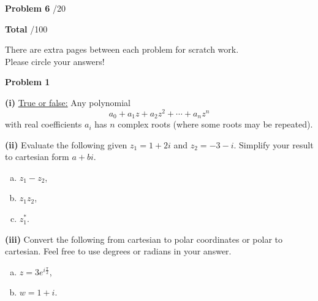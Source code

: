 \documentclass[12pt]{amsbook}
\begin{document}
\textbf{Problem 6} \; \underline{\hspace{1cm}}/20

\vspace{.5cm}

\textbf{Total} \;\hspace{1.1cm} \underline{\hspace{1.25cm}}/100

\vspace*{4cm}


\begin{center}\large{There are extra pages between each problem for scratch work.\\

Please circle your answers!}\end{center}










\newpage

\textbf{Problem 1}

\vspace{.25cm}

\textbf{(i)} \underline{True or false:} Any polynomial
\[
a_0 + a_1z+a_2z^2+\cdots +a_nz^n
\]
with real coefficients $a_i$ has $n$ complex roots (where some roots may be repeated).
\vspace*{1cm}

\textbf{(ii)} Evaluate the following given $z_1=1+2i$ and $z_2= -3-i$. Simplify your result to cartesian form $a+bi$.
\begin{enumerate}[(a)]
    \item $z_1-z_2$,
    \vspace*{2cm}
    \item $z_1z_2$,
    \vspace*{3cm}
    \item $z_1^*$.
\end{enumerate}
\vspace*{4cm}

\textbf{(iii)} Convert the following from cartesian to polar coordinates or polar to cartesian. Feel free to use degrees or radians in your answer.
\begin{enumerate}[(a)]
    \item $z = 3e^{i \frac{\pi}{2}}$,
    \vspace*{3cm}
    \item $w = 1+i$.
\end{enumerate}
    
\end{document}
